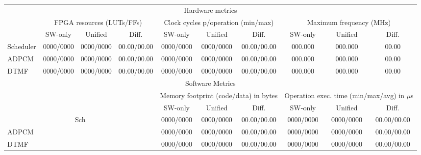 
\begin{tabular}{|lccccccccc|}
\hline
\multicolumn{10}{|c|}{Hardware metrics}\\
            &   \multicolumn{3}{c}{FPGA resources (LUTs/FFs)}   &   \multicolumn{3}{c}{Clock cycles p/operation (min/max)}  &   \multicolumn{3}{c|}{Maximum frequency (MHz)}\\
            &   SW-only     &   Unified     &       Diff.       &   SW-only     &      Unified      &       Diff.           &   SW-only     &   Unified     &      Diff.   \\
Scheduler   &0000/0000&0000/0000&00.00/00.00&0000/0000&0000/0000&00.00/00.00&000.000&000.000&00.00\\
ADPCM       &0000/0000&0000/0000&00.00/00.00&0000/0000&0000/0000&00.00/00.00&000.000&000.000&00.00\\
DTMF        &0000/0000&0000/0000&00.00/00.00&0000/0000&0000/0000&00.00/00.00&000.000&000.000&00.00\\
\hline
\multicolumn{10}{|c|}{Software Metrics}\\
           &&&                  &   \multicolumn{3}{c}{Memory footprint (code/data) in bytes}   & \multicolumn{3}{c}{Operation exec. time (min/max/avg) in $\mu$s} \\
           &&&                  &   SW-only     &       Unified         &       Diff.           & SW-only       &Unified      &     Diff. \\
\multicolumn{4}{c}{Sch}&0000/0000&0000/0000&00.00/00.00&0000/0000&0000/0000&00.00/00.00\\
ADPCM     &&&&0000/0000&0000/0000&00.00/00.00&0000/0000&0000/0000&00.00/00.00\\
DTMF      &&&&0000/0000&0000/0000&00.00/00.00&0000/0000&0000/0000&00.00/00.00\\
\hline

\end{tabular}



